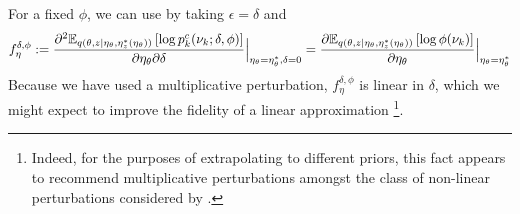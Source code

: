 For a fixed $\phi$, we can use  by taking
$\epsilon = \delta$ and
%
\begin{align*}
f^{\delta,\phi}_\eta :=
\frac{\partial^2
    \mathbb{E}_{q\left(\theta, z \vert \eta_\theta, \eta_z^{*}(\eta_\theta)\right)} \left[ \log p^c_{k}(\nu_k ; \delta, \phi) \right]}
{\partial \eta_\theta \partial \delta}
    \Big\rvert_{\eta_\theta = \eta_\theta^{*}, \delta = 0} =
\frac{\partial
    \mathbb{E}_{q\left(\theta, z \vert \eta_\theta, \eta_z^{*}(\eta_\theta)\right)} \left[ \log\phi(\nu_k) \right]}
{\partial \eta_\theta}
    \Big\rvert_{\eta_\theta = \eta_\theta^{*}}
\end{align*}
%
Because we have used a multiplicative perturbation, $f^{\delta,\phi}_\eta$
is linear in $\delta$, which we might expect to improve the fidelity of a
linear approximation
%
\footnote{Indeed, for the purposes of extrapolating to different priors, this
fact appears to recommend multiplicative perturbations amongst the class of
non-linear perturbations considered by \citet{gustafson:1996:localposterior}.}.
%
